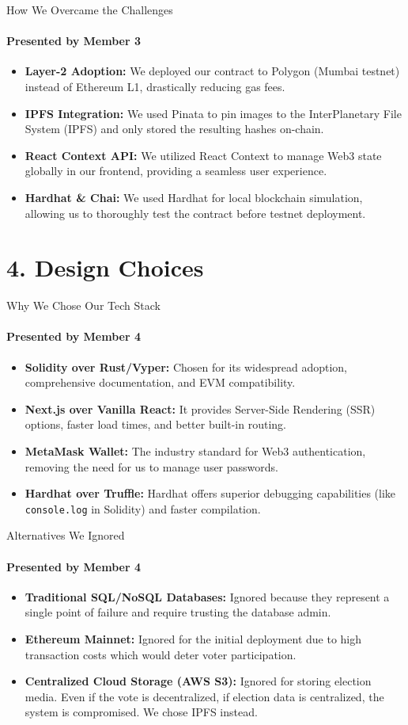 \documentclass[aspectratio=169]{beamer}	%
\begin{document}
\begin{frame}{How We Overcame the Challenges}
\framesubtitle{Presented by Member 3}
\begin{itemize}
    \item \textbf{Layer-2 Adoption:} We deployed our contract to Polygon (Mumbai testnet) instead of Ethereum L1, drastically reducing gas fees.
    \item \textbf{IPFS Integration:} We used Pinata to pin images to the InterPlanetary File System (IPFS) and only stored the resulting hashes on-chain.
    \item \textbf{React Context API:} We utilized React Context to manage Web3 state globally in our frontend, providing a seamless user experience.
    \item \textbf{Hardhat \& Chai:} We used Hardhat for local blockchain simulation, allowing us to thoroughly test the contract before testnet deployment.
\end{itemize}
\end{frame}

\section{4. Design Choices}

\begin{frame}{Why We Chose Our Tech Stack}
\framesubtitle{Presented by Member 4}
\begin{itemize}
    \item \textbf{Solidity over Rust/Vyper:} Chosen for its widespread adoption, comprehensive documentation, and EVM compatibility.
    \item \textbf{Next.js over Vanilla React:} It provides Server-Side Rendering (SSR) options, faster load times, and better built-in routing.
    \item \textbf{MetaMask Wallet:} The industry standard for Web3 authentication, removing the need for us to manage user passwords.
    \item \textbf{Hardhat over Truffle:} Hardhat offers superior debugging capabilities (like \texttt{console.log} in Solidity) and faster compilation.
\end{itemize}
\end{frame}

\begin{frame}{Alternatives We Ignored}
\framesubtitle{Presented by Member 4}
\begin{itemize}
    \item \textbf{Traditional SQL/NoSQL Databases:} Ignored because they represent a single point of failure and require trusting the database admin.
    \item \textbf{Ethereum Mainnet:} Ignored for the initial deployment due to high transaction costs which would deter voter participation.
    \item \textbf{Centralized Cloud Storage (AWS S3):} Ignored for storing election media. Even if the vote is decentralized, if election data is centralized, the system is compromised. We chose IPFS instead.
\end{itemize}
\end{frame}
\end{document}
